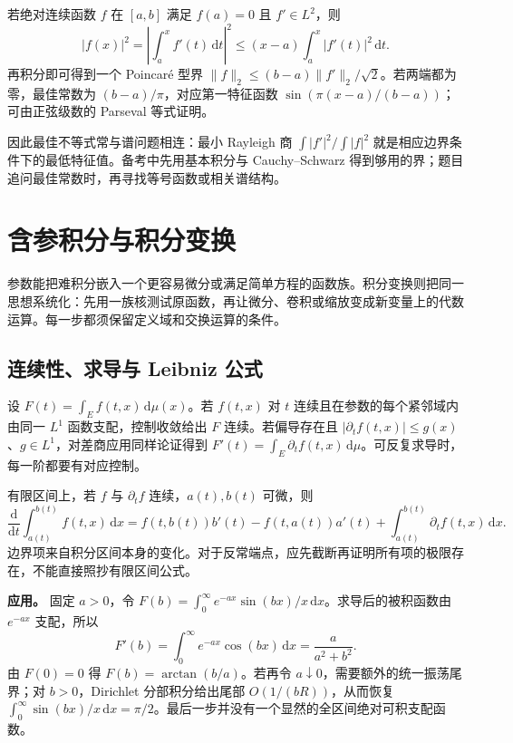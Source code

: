 \documentclass[UTF8,12pt,a4paper,fontset=fandol]{ctexart}
\begin{document}
若绝对连续函数 $f$ 在 $[a,b]$ 满足 $f(a)=0$ 且 $f'\in L^2$，则
\[
|f(x)|^2=\left|\int_a^xf'(t)\,\mathrm dt\right|^2
\leq(x-a)\int_a^x|f'(t)|^2\,\mathrm dt.
\]
再积分即可得到一个 Poincaré 型界 $\|f\|_2\leq(b-a)\|f'\|_2/\sqrt2$。若两端都为零，最佳常数为 $(b-a)/\pi$，对应第一特征函数 $\sin(\pi(x-a)/(b-a))$；可由正弦级数的 Parseval 等式证明。

因此最佳不等式常与谱问题相连：最小 Rayleigh 商 $\int|f'|^2/\int|f|^2$ 就是相应边界条件下的最低特征值。备考中先用基本积分与 Cauchy--Schwarz 得到够用的界；题目追问最佳常数时，再寻找等号函数或相关谱结构。



\section{含参积分与积分变换}

参数能把难积分嵌入一个更容易微分或满足简单方程的函数族。积分变换则把同一思想系统化：先用一族核测试原函数，再让微分、卷积或缩放变成新变量上的代数运算。每一步都须保留定义域和交换运算的条件。

\subsection{连续性、求导与 Leibniz 公式}

\label{app:transform-parameter}

设 $F(t)=\int_Ef(t,x)\,\mathrm d\mu(x)$。若 $f(t,x)$ 对 $t$ 连续且在参数的每个紧邻域内由同一 $L^1$ 函数支配，控制收敛给出 $F$ 连续。若偏导存在且 $|\partial_tf(t,x)|\leq g(x)$、$g\in L^1$，对差商应用同样论证得到 $F'(t)=\int_E\partial_tf(t,x)\,\mathrm d\mu$。可反复求导时，每一阶都要有对应控制。

有限区间上，若 $f$ 与 $\partial_tf$ 连续，$a(t),b(t)$ 可微，则
\[
\frac{\mathrm d}{\mathrm dt}\int_{a(t)}^{b(t)}f(t,x)\,\mathrm dx
=f(t,b(t))b'(t)-f(t,a(t))a'(t)+\int_{a(t)}^{b(t)}\partial_tf(t,x)\,\mathrm dx.
\]
边界项来自积分区间本身的变化。对于反常端点，应先截断再证明所有项的极限存在，不能直接照抄有限区间公式。

\textbf{应用。} 固定 $a>0$，令 $F(b)=\int_0^\infty e^{-ax}\sin(bx)/x\,\mathrm dx$。求导后的被积函数由 $e^{-ax}$ 支配，所以
\[
F'(b)=\int_0^\infty e^{-ax}\cos(bx)\,\mathrm dx=\frac a{a^2+b^2}.
\]
由 $F(0)=0$ 得 $F(b)=\arctan(b/a)$。若再令 $a\downarrow0$，需要额外的统一振荡尾界；对 $b>0$，Dirichlet 分部积分给出尾部 $O(1/(bR))$，从而恢复 $\int_0^\infty\sin(bx)/x\,\mathrm dx=\pi/2$。最后一步并没有一个显然的全区间绝对可积支配函数。
\end{document}
